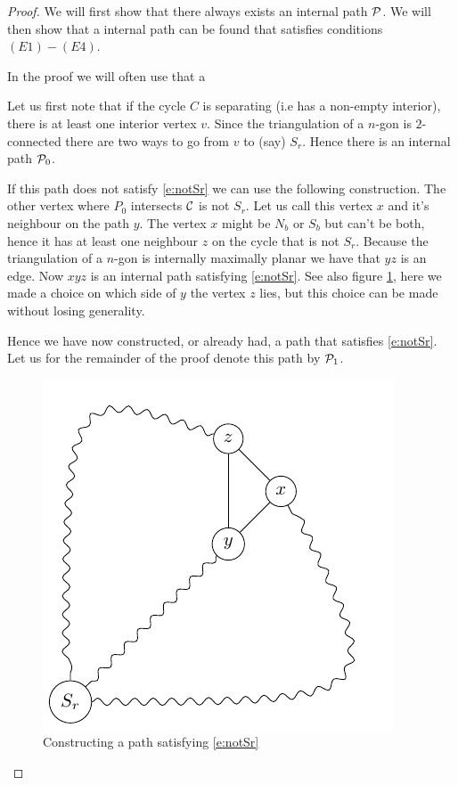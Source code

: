 \begin{proof}
We will first show that there always exists an internal path $\P$. We will then show that a internal path can be found that satisfies conditions $(E1) - (E4)$.

In the proof we will often use that a 

Let us first note that if the cycle $C$ is separating (i.e has a non-empty interior), there is at least one interior vertex $v$. Since the triangulation of a $n$-gon is $2$-connected there are two ways to go from $v$ to (say) $S_r$. Hence there is an internal path $\P_0$.

If this path does not satisfy \ref{e:notSr} we can use the following construction. The other vertex where $P_0$ intersects $\C$ is not $S_r$. Let us call this vertex $x$ and it's neighbour on the path $y$. The vertex $x$ might be $N_b$ or $S_b$ but can't be both, hence it has at least one neighbour $z$ on the cycle that is not $S_r$. Because the triangulation of a $n$-gon is internally maximally planar we have that $yz$ is an edge. Now $xyz$ is an internal path satisfying \ref{e:notSr}. See also figure \ref{fig:E1}, here we made a choice on which side of $y$ the vertex $z$ lies, but this choice can be made without losing generality.

Hence we have now constructed, or already had, a path that satisfies \ref{e:notSr}. Let us for the remainder of the proof denote this path by $\P_1$.


\begin{figure}[ht]
\centering
\includegraphics[]{algo/img/E1}
\caption{Constructing a path satisfying \ref{e:notSr} \label{fig:E1}}
\end{figure}


\end{proof}
